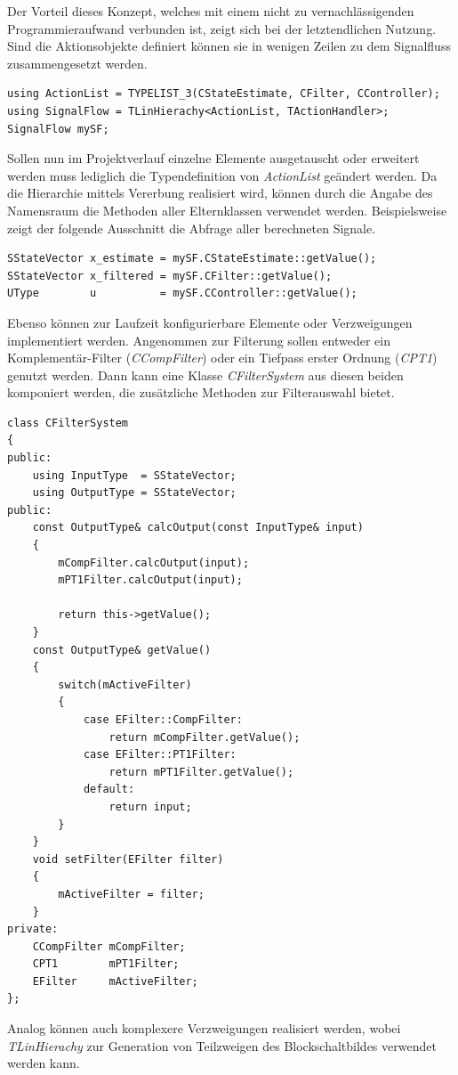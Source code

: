 Der Vorteil dieses Konzept, welches mit einem nicht zu vernachlässigenden Programmieraufwand verbunden ist, zeigt sich bei der letztendlichen Nutzung. Sind die Aktionsobjekte definiert können sie in wenigen Zeilen zu dem Signalfluss zusammengesetzt werden.
\begin{lstlisting}[caption={Anwendungsbeispiel der linearen Hierarchie},captionpos=b]
using ActionList = TYPELIST_3(CStateEstimate, CFilter, CController);
using SignalFlow = TLinHierachy<ActionList, TActionHandler>;
SignalFlow mySF;
\end{lstlisting}
Sollen nun im Projektverlauf einzelne Elemente ausgetauscht oder erweitert werden muss lediglich die Typendefinition von \textit{ActionList} geändert werden. Da die Hierarchie mittels Vererbung realisiert wird, können durch die Angabe des Namensraum die Methoden aller Elternklassen verwendet werden. Beispielsweise zeigt der folgende Ausschnitt die Abfrage aller berechneten Signale.
\begin{lstlisting}[caption={Beispiel für den Zugriff auf Aktionsobjekte in der Hierarchie},captionpos=b]
SStateVector x_estimate = mySF.CStateEstimate::getValue();
SStateVector x_filtered = mySF.CFilter::getValue();
UType        u          = mySF.CController::getValue();
\end{lstlisting}
Ebenso können zur Laufzeit konfigurierbare Elemente oder Verzweigungen implementiert werden. Angenommen zur Filterung sollen entweder ein Komplementär-Filter (\textit{CCompFilter}) oder ein Tiefpass erster Ordnung (\textit{CPT1}) genutzt werden. Dann kann eine Klasse \textit{CFilterSystem} aus diesen beiden komponiert werden, die zusätzliche Methoden zur Filterauswahl bietet.
\begin{lstlisting}[caption={Beispiel für die komponierte Aktionsobjekte},captionpos=b]
class CFilterSystem
{
public:
	using InputType  = SStateVector;
	using OutputType = SStateVector;
public:
	const OutputType& calcOutput(const InputType& input)
	{
		mCompFilter.calcOutput(input);
		mPT1Filter.calcOutput(input);
		
		return this->getValue();
	}
	const OutputType& getValue()
	{
		switch(mActiveFilter)
		{
			case EFilter::CompFilter:
				return mCompFilter.getValue();
			case EFilter::PT1Filter:
				return mPT1Filter.getValue();
			default:
				return input;
		}
	}
	void setFilter(EFilter filter)
	{
		mActiveFilter = filter;
	}
private:
	CCompFilter mCompFilter;
	CPT1        mPT1Filter;
	EFilter     mActiveFilter;
};
\end{lstlisting}
Analog können auch komplexere Verzweigungen realisiert werden, wobei \textit{TLinHierachy} zur Generation von Teilzweigen des Blockschaltbildes verwendet werden kann.